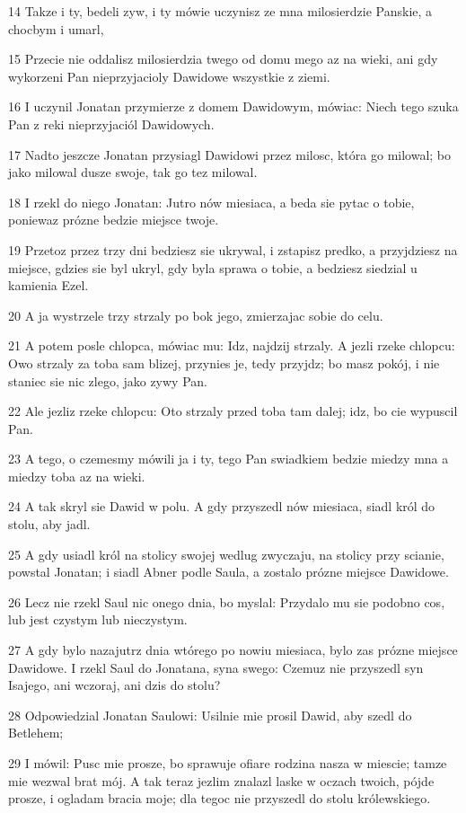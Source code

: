 \par 14 Takze i ty, bedeli zyw, i ty mówie uczynisz ze mna milosierdzie Panskie, a chocbym i umarl,
\par 15 Przecie nie oddalisz milosierdzia twego od domu mego az na wieki, ani gdy wykorzeni Pan nieprzyjacioly Dawidowe wszystkie z ziemi.
\par 16 I uczynil Jonatan przymierze z domem Dawidowym, mówiac: Niech tego szuka Pan z reki nieprzyjaciól Dawidowych.
\par 17 Nadto jeszcze Jonatan przysiagl Dawidowi przez milosc, która go milowal; bo jako milowal dusze swoje, tak go tez milowal.
\par 18 I rzekl do niego Jonatan: Jutro nów miesiaca, a beda sie pytac o tobie, poniewaz prózne bedzie miejsce twoje.
\par 19 Przetoz przez trzy dni bedziesz sie ukrywal, i zstapisz predko, a przyjdziesz na miejsce, gdzies sie byl ukryl, gdy byla sprawa o tobie, a bedziesz siedzial u kamienia Ezel.
\par 20 A ja wystrzele trzy strzaly po bok jego, zmierzajac sobie do celu.
\par 21 A potem posle chlopca, mówiac mu: Idz, najdzij strzaly. A jezli rzeke chlopcu: Owo strzaly za toba sam blizej, przynies je, tedy przyjdz; bo masz pokój, i nie staniec sie nic zlego, jako zywy Pan.
\par 22 Ale jezliz rzeke chlopcu: Oto strzaly przed toba tam dalej; idz, bo cie wypuscil Pan.
\par 23 A tego, o czemesmy mówili ja i ty, tego Pan swiadkiem bedzie miedzy mna a miedzy toba az na wieki.
\par 24 A tak skryl sie Dawid w polu. A gdy przyszedl nów miesiaca, siadl król do stolu, aby jadl.
\par 25 A gdy usiadl król na stolicy swojej wedlug zwyczaju, na stolicy przy scianie, powstal Jonatan; i siadl Abner podle Saula, a zostalo prózne miejsce Dawidowe.
\par 26 Lecz nie rzekl Saul nic onego dnia, bo myslal: Przydalo mu sie podobno cos, lub jest czystym lub nieczystym.
\par 27 A gdy bylo nazajutrz dnia wtórego po nowiu miesiaca, bylo zas prózne miejsce Dawidowe. I rzekl Saul do Jonatana, syna swego: Czemuz nie przyszedl syn Isajego, ani wczoraj, ani dzis do stolu?
\par 28 Odpowiedzial Jonatan Saulowi: Usilnie mie prosil Dawid, aby szedl do Betlehem;
\par 29 I mówil: Pusc mie prosze, bo sprawuje ofiare rodzina nasza w miescie; tamze mie wezwal brat mój. A tak teraz jezlim znalazl laske w oczach twoich, pójde prosze, i ogladam bracia moje; dla tegoc nie przyszedl do stolu królewskiego.
